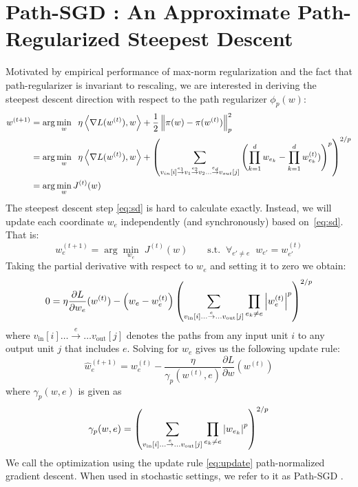 \documentclass[11pt]{article}
\newcommand{\vin}{v_{in}}
\newcommand{\vout}{v_{out}}
\newcommand{\RSGD}{Path-SGD }
\begin{document}
\section{\RSGD: An Approximate Path-Regularized Steepest Descent}
Motivated by empirical performance of max-norm regularization and the
fact that path-regularizer is invariant to rescaling, we are
interested in deriving the steepest descent direction with respect to
the path regularizer $\phi_p(w)$:
\begin{align}\label{eq:sd}
w^{(t+1)} &= \arg\min_w \;\;\eta \inner{ \nabla L(w^{(t)})}{w} + \frac{1}{2}\norm{\pi(w)-\pi(w^{(t)})}_p^2\\ \notag
&= \arg\min_w \;\;\eta \inner{ \nabla L(w^{(t)}) }{w} + \left(\sum_{\vin[i] \overset{e_1}\rightarrow v_1\overset{e_2}\rightarrow v_2\dots\overset{e_d}{\rightarrow}\vout[j]}\left(\prod_{k=1}^d w_{e_k} - \prod_{k=1}^d w^{(t)}_{e_k})\right)^p\right)^{2/p}\\ \notag
& = \arg\min_w J^{(t)}(w)
\end{align}
The steepest descent step \eqref{eq:sd} is hard to calculate exactly.  Instead, we will update each coordinate $w_e$ independently (and synchronously) based on~\eqref{eq:sd}. That is:
\begin{equation}
w^{(t+1)}_e =\arg\min_{w_e} \;J^{(t)}(w) \qquad \text{s.t.}\;\;\forall_{e'\neq e} \;\;w_{e'}=w^{(t)}_{e'}
\end{equation}
Taking the partial derivative with respect to $w_e$ and setting it to zero we obtain:
\begin{equation*}
0 =\eta \frac{\partial L}{\partial w_e}(w^{(t)}) - \left(w_e-w^{(t)}_e\right) \left(\sum_{v_{\text{in}}[i] \dots \stackrel{e}{\rightarrow} \dots v_{\text{out}}[j]} \prod_{e_k\neq e} \left\lvert{w^{(t)}_e}\right\rvert^p\right)^{2/p}
\end{equation*}
where $v_{\text{in}}[i] \dots \stackrel{e}{\rightarrow} \dots v_{\text{out}}[j]$ denotes the paths from any input unit $i$ to any output unit $j$ that includes $e$. Solving for $w_e$  gives us the following update rule:
\begin{equation}\label{eq:update}
\hat{w}^{(t+1)}_e = w^{(t)}_e- \frac{\eta}{\gamma_p(w^{(t)},e)}\frac{\partial L}{\partial w}(w^{(t)})
\end{equation}
where $\gamma_p(w,e)$ is given as
\begin{equation}
\gamma_p(w,e) =\left(\sum_{v_{\text{in}}[i] \dots \stackrel{e}{\rightarrow} \dots v_{\text{out}}[j]} \prod_{e_k\neq e} \left\lvert{w_{e_k}}\right\rvert^p\right)^{2/p}
\end{equation}
We call the optimization using the update rule \eqref{eq:update} path-normalized gradient descent. When used in stochastic settings, we refer to it as \RSGD.
\end{document}
